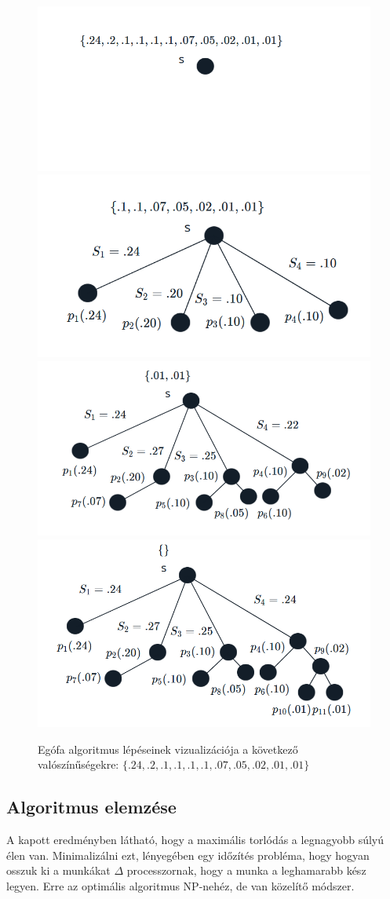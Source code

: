 \documentclass[12pt]{report}
\begin{document}
\begin{figure}[H]
	\begin{center}
		\includegraphics[width=0.49\linewidth]{pictures/egofa1.png}
		\includegraphics[width=0.49\linewidth]{pictures/egofa2.png}
		\includegraphics[width=0.49\linewidth]{pictures/egofa3.png}
		\includegraphics[width=0.49\linewidth]{pictures/egofa4.png}
		\caption{Egófa algoritmus lépéseinek vizualizációja a következő valószínűségekre: 
			\( \{.24, .2, .1, .1, .1, .1, .07, .05, .02, .01, .01\}\)}
		\label{egotree-algorithm}
	\end{center}
\end{figure}


\subsection{Algoritmus elemzése}

A kapott eredményben látható, hogy a maximális torlódás a legnagyobb súlyú élen van.
Minimalizálni ezt, lényegében egy időzítés probléma, hogy hogyan osszuk ki a munkákat \(\Delta\) processzornak, hogy a munka a leghamarabb kész legyen.
Erre az optimális algoritmus NP-nehéz, de van közelítő módszer.
\end{document}
